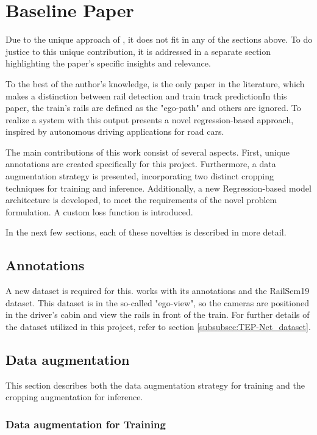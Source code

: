 \section{Baseline Paper}
\label{sec:baselinepaper}

Due to the unique approach of \cite{tepNet2024}, it does not fit in any of the sections above.
To do justice to this unique contribution, it is addressed in a separate section highlighting the paper's specific insights and relevance. 

To the best of the author's knowledge, \cite{tepNet2024} is the only paper in the literature, which makes a distinction between rail detection and train track predictionIn this paper, the train's rails are defined as the "ego-path" and others are ignored.
To realize a system with this output \cite{tepNet2024} presents a novel regression-based approach, inspired by autonomous driving applications for road cars.

The main contributions of this work consist of several aspects.
First, unique annotations are created specifically for this project.
Furthermore, a data augmentation strategy is presented, incorporating two distinct cropping techniques for training and inference.
Additionally, a new Regression-based model architecture is developed, to meet the requirements of the novel problem formulation.
A custom loss function is introduced.

In the next few sections, each of these novelties is described in more detail.

\subsection{Annotations}

A new dataset is required for this. \cite{tepNet2024} works with its annotations and the RailSem19 dataset.
This dataset is in the so-called "ego-view", so the cameras are positioned in the driver's cabin and view the rails in front of the train.
For further details of the dataset utilized in this project, refer to section \ref{subsubsec:TEP-Net_dataset}.

\subsection{Data augmentation}

This section describes both the data augmentation strategy for training and the cropping augmentation for inference.

\subsubsection{Data augmentation for Training}


